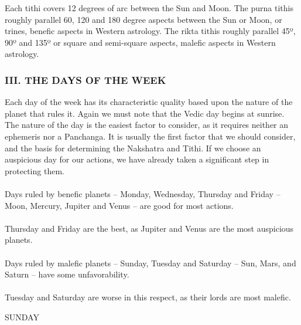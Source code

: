 \begin{enumerate}
Each tithi covers 12 degrees of arc between the Sun and Moon. The purna tithis roughly parallel 60, 120 and 180 degree aspects between the Sun or Moon, or trines, benefic aspects in Western astrology. The rikta tithis roughly parallel 45º, 90º and 135º or square and semi-square aspects, malefic aspects in Western astrology.

 

\subsubsection{III. THE DAYS OF THE WEEK}
 

Each day of the week has its characteristic quality based upon the nature of the planet that rules it. Again we must note that the Vedic day begins at sunrise. The nature of the day is the easiest factor to consider, as it requires neither an ephemeris nor a Panchanga. It is usually the first factor that we should consider, and the basis for determining the Nakshatra and Tithi. If we choose an auspicious day for our actions, we have already taken a significant step in protecting them.

 


\paragraph{}Days ruled by benefic planets – Monday, Wednesday, Thursday and Friday – Moon, Mercury, Jupiter and Venus – are good for most actions. 
\paragraph{}Thursday and Friday are the best, as Jupiter and Venus are the most auspicious planets.
\paragraph{}Days ruled by malefic planets – Sunday, Tuesday and Saturday – Sun, Mars, and Saturn – have some unfavorability. 
\paragraph{}Tuesday and Saturday are worse in this respect, as their lords are most malefic.


 

SUNDAY


\end{enumerate}
